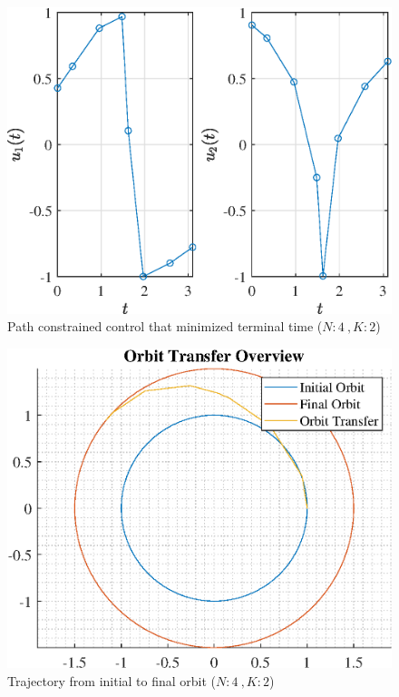 \documentclass[]{article}
\begin{document}
\begin{figure}
	\centering
	\includegraphics[scale=0.75]{path_N4_K2_C3_tf.eps}
	\caption{Path constrained control that minimized terminal time (\(N:4\ , K:2\))}
	\label{fig:path_N4_K2_C3_tf}
\end{figure}
\begin{figure}
	\centering
	\includegraphics[scale=0.75]{orbit_N4_K2_C3_tf.eps}
	\caption{Trajectory from initial to final orbit (\(N:4\ , K:2\))}
	\label{fig:orbit_N4_K2_C3_tf}
\end{figure}
\end{document}
